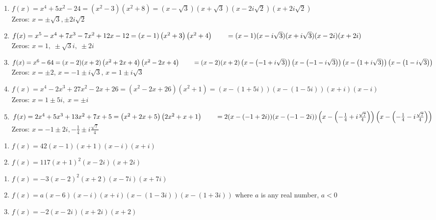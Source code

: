 \begin{enumerate}
\item  $f(x) = x^4+5x^2-24 = \left(x^2-3 \right) \left(x^2+8\right) = (x-\sqrt{3})(x+\sqrt{3})\left(x - 2i \sqrt{2}\right)\left(x + 2i \sqrt{2}\right)$\\
Zeros:  $x = \pm \sqrt{3}, \pm 2i \sqrt{2}$

\item  $f(x) = x^5 - x^4+7x^3-7x^2+12x-12 = (x-1) \left(x^2 + 3\right) \left(x^2 + 4 \right) \\
\phantom{f(x)} = (x-1)(x - i \sqrt{3})(x + i \sqrt{3})(x-2i)(x+2i)$ \\
Zeros:  $x = 1, \;  \pm  \sqrt{3}i,  \; \pm 2i$

\item $f(x) = x^6 - 64 = (x-2)(x+2)\left(x^2+2x+4\right)\left(x^2-2x+4\right) \\
      \phantom{f(x)} = (x-2)(x+2)\left( x - \left( -1+i\sqrt{3} \right) \right)\left( x - \left( -1-i\sqrt{3} \right) \right)\left( x - \left( 1+i\sqrt{3} \right) \right)\left( x - \left( 1-i\sqrt{3} \right) \right)$ \\
Zeros:  $x = \pm 2$, $x = -1 \pm i\sqrt{3}$, $x = 1 \pm i\sqrt{3}$


\item $f(x) = x^{4} - 2x^{3} + 27x^{2} - 2x + 26 = (x^{2} - 2x + 26)(x^{2} + 1) = (x - (1 + 5i))(x - (1 - 5i))(x + i)(x - i)$\\ 
Zeros: $x = 1 \pm 5i, \; x = \pm i$

\item  $f(x) = 2x^4+5x^3+13x^2+7x+5 = \left(x^2+2x+5\right) \left(2x^2+x+1\right)  \\ \phantom{f(x)} = 2 (x-(-1+2i))(x-(-1-2i))\left(x - \left(-\frac{1}{4} + i \frac{\sqrt{7}}{4}\right) \right)\left(x - \left(-\frac{1}{4} - i \frac{\sqrt{7}}{4}\right) \right) $\\
Zeros:  $x = -1 \pm 2i, -\frac{1}{4} \pm i \frac{\sqrt{7}}{4}$

\setcounter{HW}{\value{enumi}}
\end{enumerate}

\begin{multicols}{2}
\begin{enumerate}
\setcounter{enumi}{\value{HW}}

\item $f(x) = 42(x-1)(x+1)(x-i)(x+i)$


\item $f(x) = 117(x+1)^2(x-2i)(x+2i)$


\setcounter{HW}{\value{enumi}}
\end{enumerate}
\end{multicols}


\begin{enumerate}
\setcounter{enumi}{\value{HW}}

\item  $f(x) = -3(x-2)^2(x+2)(x-7i)(x+7i)$


\item $f(x) = a(x-6)(x-i)(x+i)(x-(1-3i))(x-(1+3i))$ where $a$ is any real number,  $a < 0$


\item $f(x) = -2(x-2i)(x+2i)(x+2)$

\end{enumerate}


\closegraphsfile